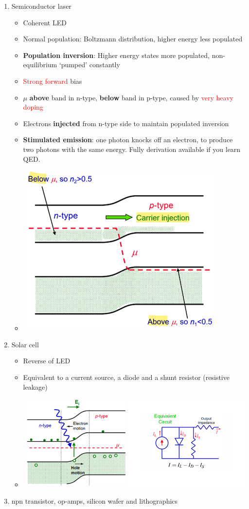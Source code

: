 \documentclass{article}
\theoremstyle{remark}
\theoremstyle{remark}
\begin{document}
\begin{enumerate}
\begin{itemize}
        \end{itemize}
    \item Semiconductor laser\begin{itemize}
            \item Coherent LED
            \item Normal population: Boltzmann distribution, higher energy less populated
            \item \textbf{Population inversion}: Higher energy states more populated, non-equilibrium `pumped' constantly
            \item \textcolor{red}{Strong forward} bias
            \item $\mu$ \textbf{above} band in n-type, \textbf{below} band in p-type, caused by \textcolor{red}{ very heavy doping}
            \item Electrons \textbf{injected} from n-type side to maintain populated inversion
            \item \textbf{Stimulated emission}: one photon knocks off an electron, to produce two photons with the same energy. Fully derivation available if you learn QED.
            \item \includegraphics*[width=0.4\linewidth]{cmp_laser.png}
        \end{itemize}
    \item Solar cell\begin{itemize}
            \item Reverse of LED
            \item Equivalent to a current source, a diode and a shunt resistor (resistive leakage)
            \item \includegraphics*[width=0.6\linewidth]{cmp_solar_cell.png}
        \end{itemize}
    \item npn transistor, op-amps, silicon wafer and lithographics
\end{enumerate}
\end{document}
